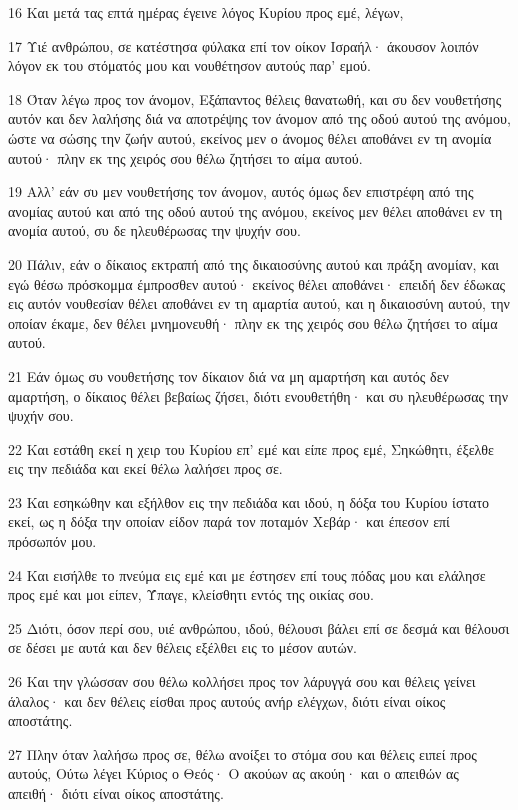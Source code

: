 \par 16 Και μετά τας επτά ημέρας έγεινε λόγος Κυρίου προς εμέ, λέγων,
\par 17 Υιέ ανθρώπου, σε κατέστησα φύλακα επί τον οίκον Ισραήλ· άκουσον λοιπόν λόγον εκ του στόματός μου και νουθέτησον αυτούς παρ' εμού.
\par 18 Όταν λέγω προς τον άνομον, Εξάπαντος θέλεις θανατωθή, και συ δεν νουθετήσης αυτόν και δεν λαλήσης διά να αποτρέψης τον άνομον από της οδού αυτού της ανόμου, ώστε να σώσης την ζωήν αυτού, εκείνος μεν ο άνομος θέλει αποθάνει εν τη ανομία αυτού· πλην εκ της χειρός σου θέλω ζητήσει το αίμα αυτού.
\par 19 Αλλ' εάν συ μεν νουθετήσης τον άνομον, αυτός όμως δεν επιστρέφη από της ανομίας αυτού και από της οδού αυτού της ανόμου, εκείνος μεν θέλει αποθάνει εν τη ανομία αυτού, συ δε ηλευθέρωσας την ψυχήν σου.
\par 20 Πάλιν, εάν ο δίκαιος εκτραπή από της δικαιοσύνης αυτού και πράξη ανομίαν, και εγώ θέσω πρόσκομμα έμπροσθεν αυτού· εκείνος θέλει αποθάνει· επειδή δεν έδωκας εις αυτόν νουθεσίαν θέλει αποθάνει εν τη αμαρτία αυτού, και η δικαιοσύνη αυτού, την οποίαν έκαμε, δεν θέλει μνημονευθή· πλην εκ της χειρός σου θέλω ζητήσει το αίμα αυτού.
\par 21 Εάν όμως συ νουθετήσης τον δίκαιον διά να μη αμαρτήση και αυτός δεν αμαρτήση, ο δίκαιος θέλει βεβαίως ζήσει, διότι ενουθετήθη· και συ ηλευθέρωσας την ψυχήν σου.
\par 22 Και εστάθη εκεί η χειρ του Κυρίου επ' εμέ και είπε προς εμέ, Σηκώθητι, έξελθε εις την πεδιάδα και εκεί θέλω λαλήσει προς σε.
\par 23 Και εσηκώθην και εξήλθον εις την πεδιάδα και ιδού, η δόξα του Κυρίου ίστατο εκεί, ως η δόξα την οποίαν είδον παρά τον ποταμόν Χεβάρ· και έπεσον επί πρόσωπόν μου.
\par 24 Και εισήλθε το πνεύμα εις εμέ και με έστησεν επί τους πόδας μου και ελάλησε προς εμέ και μοι είπεν, Ύπαγε, κλείσθητι εντός της οικίας σου.
\par 25 Διότι, όσον περί σου, υιέ ανθρώπου, ιδού, θέλουσι βάλει επί σε δεσμά και θέλουσι σε δέσει με αυτά και δεν θέλεις εξέλθει εις το μέσον αυτών.
\par 26 Και την γλώσσαν σου θέλω κολλήσει προς τον λάρυγγά σου και θέλεις γείνει άλαλος· και δεν θέλεις είσθαι προς αυτούς ανήρ ελέγχων, διότι είναι οίκος αποστάτης.
\par 27 Πλην όταν λαλήσω προς σε, θέλω ανοίξει το στόμα σου και θέλεις ειπεί προς αυτούς, Ούτω λέγει Κύριος ο Θεός· Ο ακούων ας ακούη· και ο απειθών ας απειθή· διότι είναι οίκος αποστάτης.


